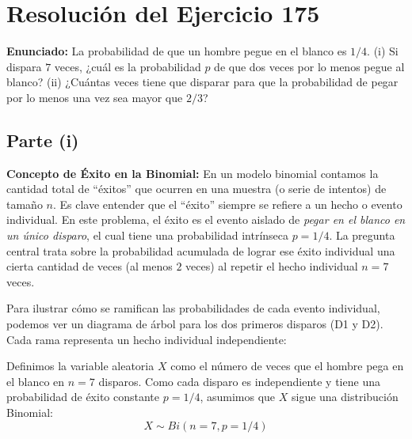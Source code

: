 \documentclass[11pt, a4paper]{article}
\begin{document}
\section*{Resolución del Ejercicio 175}

\textbf{Enunciado:} La probabilidad de que un hombre pegue en el blanco es $1/4$.
(i) Si dispara $7$ veces, ¿cuál es la probabilidad $p$ de que dos veces por lo menos pegue al blanco?
(ii) ¿Cuántas veces tiene que disparar para que la probabilidad de pegar por lo menos una vez sea mayor que $2/3$?

\vspace{0.5cm}

\subsection*{Parte (i)}

\textbf{Concepto de Éxito en la Binomial:} En un modelo binomial contamos la cantidad total de ``éxitos'' que ocurren en una muestra (o serie de intentos) de tamaño $n$. Es clave entender que el ``éxito'' siempre se refiere a un hecho o evento individual. En este problema, el éxito es el evento aislado de \textit{pegar en el blanco en un único disparo}, el cual tiene una probabilidad intrínseca $p = 1/4$. La pregunta central trata sobre la probabilidad acumulada de lograr ese éxito individual una cierta cantidad de veces (al menos $2$ veces) al repetir el hecho individual $n = 7$ veces.

Para ilustrar cómo se ramifican las probabilidades de cada evento individual, podemos ver un diagrama de árbol para los dos primeros disparos (D1 y D2). Cada rama representa un hecho individual independiente:

\begin{center}
\end{center}
\vspace{0.3cm}

Definimos la variable aleatoria $X$ como el número de veces que el hombre pega en el blanco en $n = 7$ disparos. Como cada disparo es independiente y tiene una probabilidad de éxito constante $p = 1/4$, asumimos que $X$ sigue una distribución Binomial:
\[ X \sim Bi(n = 7, p = 1/4) \]
\end{document}
